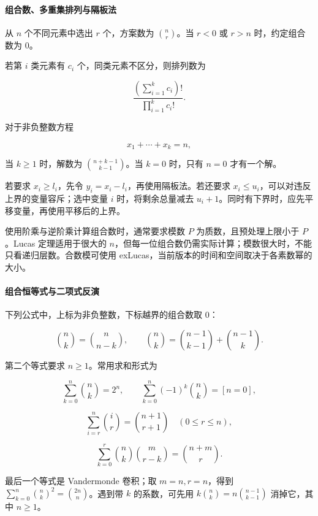 \hypertarget{ux7ec4ux5408ux6570ux591aux91cdux96c6ux6392ux5217ux4e0eux9694ux677fux6cd5}{%
\paragraph{组合数、多重集排列与隔板法}\label{ux7ec4ux5408ux6570ux591aux91cdux96c6ux6392ux5217ux4e0eux9694ux677fux6cd5}}

从 \(n\) 个不同元素中选出 \(r\) 个，方案数为 \(\binom{n}{r}\)。当 \(r<0\) 或 \(r>n\) 时，约定组合数为 \(0\)。

若第 \(i\) 类元素有 \(c_i\) 个，同类元素不区分，则排列数为

\[
\frac{\left(\sum_{i=1}^{k}c_i\right)!}{\prod_{i=1}^{k}c_i!}.
\]

对于非负整数方程

\[
x_1+\cdots+x_k=n,
\]

当 \(k\ge1\) 时，解数为 \(\binom{n+k-1}{k-1}\)。当 \(k=0\) 时，只有 \(n=0\) 才有一个解。

若要求 \(x_i\ge l_i\)，先令 \(y_i=x_i-l_i\)，再使用隔板法。若还要求 \(x_i\le u_i\)，可以对违反上界的变量容斥；选中变量 \(i\) 时，将剩余总量减去 \(u_i+1\)。同时有下界时，应先平移变量，再使用平移后的上界。

使用阶乘与逆阶乘计算组合数时，通常要求模数 \(P\) 为质数，且预处理上限小于 \(P\)。Lucas 定理适用于很大的 \(n\)，但每一位组合数仍需实际计算；模数很大时，不能只看递归层数。合数模可使用 exLucas，当前版本的时间和空间取决于各素数幂的大小。

\hypertarget{ux7ec4ux5408ux6052ux7b49ux5f0fux4e0eux4e8cux9879ux5f0fux53cdux6f14}{%
\paragraph{组合恒等式与二项式反演}\label{ux7ec4ux5408ux6052ux7b49ux5f0fux4e0eux4e8cux9879ux5f0fux53cdux6f14}}

下列公式中，上标为非负整数，下标越界的组合数取 \(0\)：

\[
\binom{n}{k}=\binom{n}{n-k},\qquad
\binom{n}{k}=\binom{n-1}{k-1}+\binom{n-1}{k}.
\]

第二个等式要求 \(n\ge1\)。常用求和形式为

\[
\sum_{k=0}^{n}\binom{n}{k}=2^n,\qquad
\sum_{k=0}^{n}(-1)^k\binom{n}{k}=[n=0],
\]

\[
\sum_{i=r}^{n}\binom{i}{r}=\binom{n+1}{r+1}\quad(0\le r\le n),
\]

\[
\sum_{k=0}^{r}\binom{n}{k}\binom{m}{r-k}=\binom{n+m}{r}.
\]

最后一个等式是 Vandermonde 卷积；取 \(m=n,r=n\)，得到 \(\sum_{k=0}^{n}\binom{n}{k}^2=\binom{2n}{n}\)。遇到带 \(k\) 的系数，可先用 \(k\binom{n}{k}=n\binom{n-1}{k-1}\) 消掉它，其中 \(n\ge1\)。

